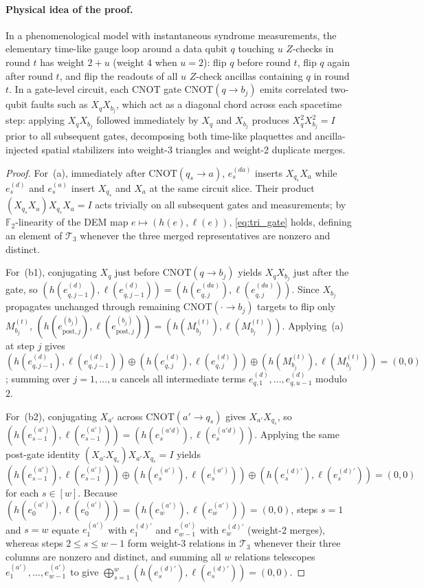 \documentclass[12pt]{article}
\theoremstyle{definition}
\newcommand{\Ftwo}{\mathbb{F}_2}
\newcommand{\Tc}{\mathcal{T}_3}
\begin{document}
\paragraph{Physical idea of the proof.}
In a phenomenological model with instantaneous syndrome measurements, the elementary time-like gauge loop around a
data qubit $q$ touching $u$ $Z$-checks in round $t$ has weight $2 + u$ (weight $4$ when $u = 2$): flip $q$ before
round $t$, flip $q$ again after round $t$, and flip the readouts of all $u$ $Z$-check ancillas containing $q$ in
round $t$. In a gate-level circuit, each CNOT gate $\mathrm{CNOT}(q \to b_j)$ emits correlated two-qubit faults
such as $X_q X_{b_j}$, which act as a diagonal chord across each spacetime step: applying $X_q X_{b_j}$ followed
immediately by $X_q$ and $X_{b_j}$ produces $X_q^2 X_{b_j}^2 = I$ prior to all subsequent gates, decomposing both
time-like plaquettes and ancilla-injected spatial stabilizers into weight-3 triangles and weight-2 duplicate
merges.

\begin{proof}
For~(a), immediately after $\mathrm{CNOT}(q_s \to a)$, $e^{(da)}_s$ inserts $X_{q_s} X_a$ while $e^{(d)}_s$ and
$e^{(a)}_s$ insert $X_{q_s}$ and $X_a$ at the same circuit slice. Their product $(X_{q_s} X_a) X_{q_s} X_a = I$ acts
trivially on all subsequent gates and measurements; by $\Ftwo$-linearity of the DEM map $e \mapsto (h(e), \ell(e))$,
\eqref{eq:tri_gate} holds, defining an element of $\Tc$ whenever the three merged representatives are nonzero and
distinct.

For~(b1), conjugating $X_q$ just before $\mathrm{CNOT}(q \to b_j)$ yields $X_q X_{b_j}$ just after the gate, so
$(h(e^{(d)}_{q, j-1}), \ell(e^{(d)}_{q, j-1})) = (h(e^{(da)}_{q, j}), \ell(e^{(da)}_{q, j}))$. Since $X_{b_j}$
propagates unchanged through remaining $\mathrm{CNOT}(\cdot \to b_j)$ targets to flip only $M_{b_j}^{(t)}$,
$(h(e^{(b_j)}_{\mathrm{post}, j}), \ell(e^{(b_j)}_{\mathrm{post}, j})) = (h(M_{b_j}^{(t)}), \ell(M_{b_j}^{(t)}))$.
Applying~(a) at step $j$ gives $(h(e^{(d)}_{q, j-1}), \ell(e^{(d)}_{q, j-1})) \oplus (h(e^{(d)}_{q, j}),
\ell(e^{(d)}_{q, j})) \oplus (h(M_{b_j}^{(t)}), \ell(M_{b_j}^{(t)})) = (0, 0)$; summing over $j = 1, \dots, u$
cancels all intermediate terms $e^{(d)}_{q, 1}, \dots, e^{(d)}_{q, u-1}$ modulo $2$.

For~(b2), conjugating $X_{a'}$ across $\mathrm{CNOT}(a' \to q_s)$ gives $X_{a'} X_{q_s}$, so
$(h(e^{(a')}_{s-1}), \ell(e^{(a')}_{s-1})) = (h(e^{(a' d)}_s), \ell(e^{(a' d)}_s))$. Applying the same post-gate
identity $(X_{a'} X_{q_s}) X_{a'} X_{q_s} = I$ yields $(h(e^{(a')}_{s-1}), \ell(e^{(a')}_{s-1})) \oplus
(h(e^{(a')}_s), \ell(e^{(a')}_s)) \oplus (h(e^{(d)'}_s), \ell(e^{(d)'}_s)) = (0, 0)$ for each $s \in [w]$. Because
$(h(e^{(a')}_0), \ell(e^{(a')}_0)) = (h(e^{(a')}_w), \ell(e^{(a')}_w)) = (0, 0)$, steps $s = 1$ and $s = w$ equate
$e^{(a')}_1$ with $e^{(d)'}_1$ and $e^{(a')}_{w-1}$ with $e^{(d)'}_w$ (weight-2 merges), whereas steps $2 \le s \le
w - 1$ form weight-3 relations in $\Tc$ whenever their three columns are nonzero and distinct, and summing all $w$
relations telescopes $e^{(a')}_1, \dots, e^{(a')}_{w-1}$ to give $\bigoplus_{s=1}^w (h(e^{(d)'}_s),
\ell(e^{(d)'}_s)) = (0, 0)$.
\end{proof}
\end{document}
